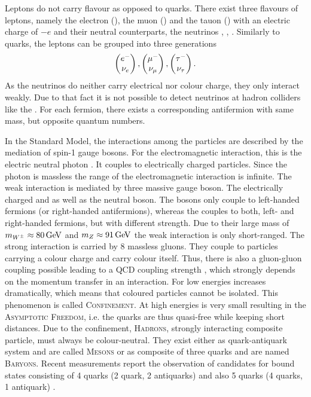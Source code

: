 Leptons do not carry flavour as opposed to quarks.
There exist three flavours of leptons, namely the electron (\en), the muon (\mun) and the tauon (\taum) with an electric charge of $-e$ and their neutral counterparts, the neutrinos \neue, \neum, \neut.
Similarly to quarks, the leptons can be grouped into three generations
\begin{align*}
    \begin{pmatrix} {\ensuremath{e^-}} \\ {{\nu}_e} \end{pmatrix},
    \begin{pmatrix} {\ensuremath{\mu^-}} \\ {{\nu}_\mu} \end{pmatrix},
    \begin{pmatrix} {\ensuremath{\tau^-}} \\ {{\nu}_\tau} \end{pmatrix}.
\end{align*}
As the neutrinos do neither carry electrical nor colour charge, they only interact weakly.
Due to that fact it is not possible to detect neutrinos at hadron colliders like the \lhc.
For each fermion, there exists a corresponding antifermion with same mass, but opposite quantum numbers.

In the Standard Model, the interactions among the particles are described by the mediation of spin-1 gauge bosons.
For the electromagnetic interaction, this is the electric neutral photon \g.
It couples to electrically charged particles.
Since the photon is massless the range of the electromagnetic interaction is infinite.
The weak interaction is mediated by three massive gauge boson.
The electrically charged \Wp and \Wm as well as the neutral \Z boson.
The \Wpm bosons only couple to left-handed fermions (or right-handed antifermions), whereas the \Z couples to both, left- and right-handed fermions, but with different strength.
Due to their large mass of $m_{{W^\pm}} \approx 80 \mathrm{\,Ge\kern -0.1em V}$ and $m_{Z} \approx 91 \mathrm{\,Ge\kern -0.1em V}$ the weak interaction is only short-ranged.
The strong interaction is carried by 8 massless gluons.
They couple to particles carrying a colour charge and carry colour itself.
Thus, there is also a gluon-gluon coupling possible leading to a QCD coupling strength \as, which strongly depends on the momentum transfer in an interaction.
For low energies \as increases dramatically, which means that coloured particles cannot be isolated.
This phenomenon is called \textsc{Confinement}.
At high energies \as is very small resulting in the \textsc{Asymptotic Freedom}, i.e. the quarks are thus quasi-free while keeping short distances.
Due to the confinement, \textsc{Hadrons}, strongly interacting composite particle, must always be colour-neutral.
They exist either as quark-antiquark system and are called \textsc{Mesons} or as composite of three quarks and are named \textsc{Baryons}.
Recent \lhcb measurements report the observation of candidates for bound states consisting of 4 quarks (2 quark, 2 antiquarks) \cite{Tetraquark} and also 5 quarks (4 quarks, 1 antiquark) \cite{Pentaquark}.

